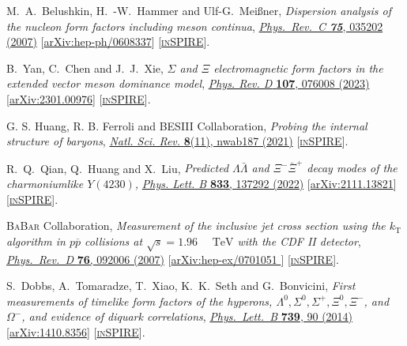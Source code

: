 \documentclass[a4paper,11pt]{article}
\begin{document}
\begin{thebibliography}{**}
 M.~A.~Belushkin, H.~-W.~Hammer and Ulf-G.~Mei\ss{}ner, 
\textit{Dispersion analysis of the nucleon form factors including meson continua},
\href{https://journals.aps.org/prc/abstract/10.1103/PhysRevC.75.035202}{\textit{Phys.\ Rev.\ C {\bf 75}}, 035202 (2007)}
[\textcolor{blue}{\href{https://arxiv.org/pdf/hep-ph/0608337.pdf}{arXiv:hep-ph/0608337}}] 
[\textcolor{blue}{\href{https://inspirehep.net/literature/725103}{\textsc{inSPIRE}}}].

B.~Yan, C.~Chen and J.~J.~Xie,
\textit{\ensuremath{\Sigma} and \ensuremath{\Xi} electromagnetic form factors in the extended vector meson dominance model},
\href{https://journals.aps.org/prd/abstract/10.1103/PhysRevD.107.076008}{\textit{Phys. Rev. D} \textbf{107}, 076008 (2023)}
[\textcolor{blue}{\href{https://arxiv.org/pdf/2301.00976.pdf}{arXiv:2301.00976}}] 
[\textcolor{blue}{\href{https://inspirehep.net/literature/2620121}{\textsc{inSPIRE}}}].

 G. S. Huang, R. B. Ferroli and BESIII Collaboration, 
\textit{Probing the internal structure of baryons},
\href{https://academic.oup.com/nsr/article/8/11/nwab187/6396767?login=false}{ \textit{Natl. Sci. Rev.} \textbf{8}(11), nwab187 (2021)}
[\textcolor{blue}{\href{https://inspirehep.net/literature/1969380}{\textsc{inSPIRE}}}].

R.~Q.~Qian, Q.~Huang and X.~Liu,
\textit{Predicted \ensuremath{\Lambda\bar\Lambda} and \ensuremath{\Xi^-\bar{\Xi}^+} decay modes of the charmoniumlike \ensuremath{Y(4230)},}
\href{https://www.sciencedirect.com/science/article/pii/S0370269322004269?via%3Dihub}{\textit{Phys. Lett. B} \textbf{833}, 137292 (2022)}
[\textcolor{blue}{\href{https://arxiv.org/pdf/2111.13821.pdf}{arXiv:2111.13821}}] 
[\textcolor{blue}{\href{https://inspirehep.net/literature/1978833}{\textsc{inSPIRE}}}].

 \textsc{BaBar}  Collaboration, 
\textit{Measurement of the inclusive jet cross section using the ${k}_{\mathrm{T}}$ algorithm in $p\overline{p}$ collisions at $\sqrt{s}=1.96\text{ }\text{ }\mathrm{TeV}$ with the CDF II detector},
\href{https://journals.aps.org/prd/abstract/10.1103/PhysRevD.75.092006}{\textit{Phys.\ Rev.\ D} {\bf 76}, 092006 (2007)}
[\textcolor{blue}{\href{https://arxiv.org/pdf/hep-ex/0701051.pdf}{arXiv:hep-ex/0701051
}}] 
[\textcolor{blue}{\href{https://inspirehep.net/literature/743342}{\textsc{inSPIRE}}}].

 S.~Dobbs, A.~Tomaradze, T.~Xiao, K.~K.~Seth and G.~Bonvicini, 
\textit{First measurements of timelike form factors of the hyperons, $\Lambda^0, \Sigma^0, \Sigma^+, \Xi^0, \Xi^-$, and $\Omega^-$, and evidence of diquark correlations},
\href{https://www.sciencedirect.com/science/article/pii/S0370269314007485?via%3Dihub}{\textit{Phys.\ Lett.\ B} {\bf 739}, 90 (2014)} 
[\textcolor{blue}{\href{https://arxiv.org/pdf/1410.8356.pdf}{arXiv:1410.8356}}] 
[\textcolor{blue}{\href{https://inspirehep.net/literature/1325098}{\textsc{inSPIRE}}}].


\end{thebibliography}
\end{document}
